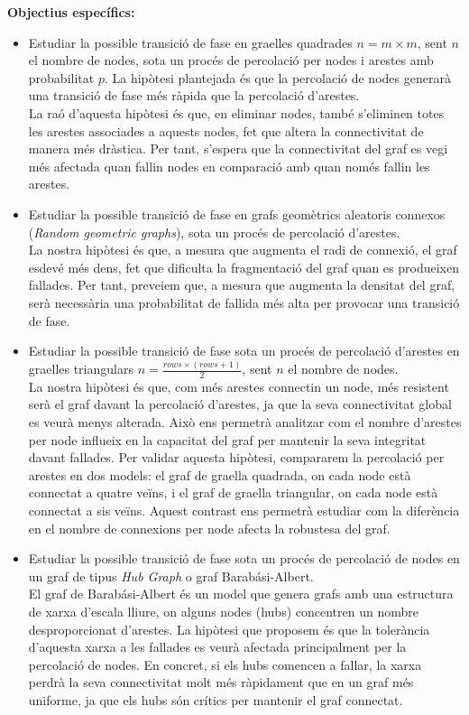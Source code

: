 \documentclass[a4paper]{article}
\begin{document}
	\textbf{Objectius específics:}
	\begin{itemize}
		\item Estudiar la possible transició de fase en graelles quadrades \( n = m \times m \), sent \( n \) el nombre de nodes, sota un procés de percolació per nodes i arestes amb probabilitat \( p \). La hipòtesi plantejada és que la percolació de nodes generarà una transició de fase més ràpida que la percolació d'arestes. \\\endgraf
		La raó d'aquesta hipòtesi és que, en eliminar nodes, també s'eliminen totes les arestes associades a aquests nodes, fet que altera la connectivitat de manera més dràstica. Per tant, s'espera que la connectivitat del graf es vegi més afectada quan fallin nodes en comparació amb quan només fallin les arestes.
		
		\item Estudiar la possible transició de fase en grafs geomètrics aleatoris connexos (\textit{Random geometric graphs}), sota un procés de percolació d’arestes. \\\endgraf
		La nostra hipòtesi és que, a mesura que augmenta el radi de connexió, el graf esdevé més dens, fet que dificulta la fragmentació del graf quan es produeixen fallades. Per tant, preveiem que, a mesura que augmenta la densitat del graf, serà necessària una probabilitat de fallida més alta per provocar una transició de fase.
		
		\item Estudiar la possible transició de fase sota un procés de percolació d'arestes en graelles triangulars \( n = \frac{rows \times (rows + 1)}{2} \), sent \( n \) el nombre de nodes. \\\endgraf
		La nostra hipòtesi és que, com més arestes connectin un node, més resistent serà el graf davant la percolació d'arestes, ja que la seva connectivitat global es veurà menys alterada. Això ens permetrà analitzar com el nombre d'arestes per node influeix en la capacitat del graf per mantenir la seva integritat davant fallades. Per validar aquesta hipòtesi, compararem la percolació per arestes en dos models: el graf de graella quadrada, on cada node està connectat a quatre veïns, i el graf de graella triangular, on cada node està connectat a sis veïns. Aquest contrast ens permetrà estudiar com la diferència en el nombre de connexions per node afecta la robustesa del graf.
		
		\item Estudiar la possible transició de fase sota un procés de percolació de nodes en un graf de tipus \textit{Hub Graph} o graf Barabási-Albert. \\\endgraf
		El graf de Barabási-Albert és un model que genera grafs amb una estructura de xarxa d'escala lliure, on alguns nodes (hubs) concentren un nombre desproporcionat d'arestes. La hipòtesi que proposem és que la tolerància d'aquesta xarxa a les fallades es veurà afectada principalment per la percolació de nodes. En concret, si els hubs comencen a fallar, la xarxa perdrà la seva connectivitat molt més ràpidament que en un graf més uniforme, ja que els hubs són crítics per mantenir el graf connectat.
	\end{itemize}
	
\end{document}
